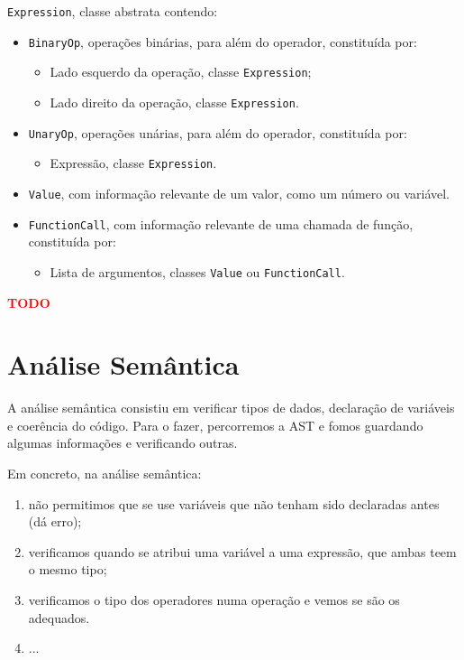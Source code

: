 \documentclass[12pt,a4paper]{report}
\begin{document}
\texttt{Expression}, classe abstrata contendo:
\begin{itemize}
    \item \texttt{BinaryOp}, operações binárias, para além do operador, constituída por:
    \begin{itemize}
        \item Lado esquerdo da operação, classe \texttt{Expression};
        \item Lado direito da operação, classe \texttt{Expression}.
    \end{itemize}
    \item \texttt{UnaryOp}, operações unárias, para além do operador, constituída por:
    \begin{itemize}
        \item Expressão, classe \texttt{Expression}.
    \end{itemize}
    \item \texttt{Value}, com informação relevante de um valor, como um número ou variável.
    \item \texttt{FunctionCall}, com informação relevante de uma chamada de função, constituída por:
    \begin{itemize}
        \item Lista de argumentos, classes \texttt{Value} ou \texttt{FunctionCall}.
    \end{itemize}
\end{itemize}

\textcolor{red}{\textbf{TODO}}

\chapter{Análise Semântica}

A análise semântica consistiu em verificar tipos de dados, declaração de variáveis e coerência do código. Para o fazer, percorremos a AST e fomos guardando algumas informações
e verificando outras.

Em concreto, na análise semântica:
\begin{enumerate}
    \item não permitimos que se use variáveis que não tenham sido declaradas antes (dá erro);
    \item verificamos quando se atribui uma variável a uma expressão, que ambas teem o mesmo tipo;
    \item verificamos o tipo dos operadores numa operação e vemos se são os adequados.
    \item ...
\end{enumerate}
\end{document}
